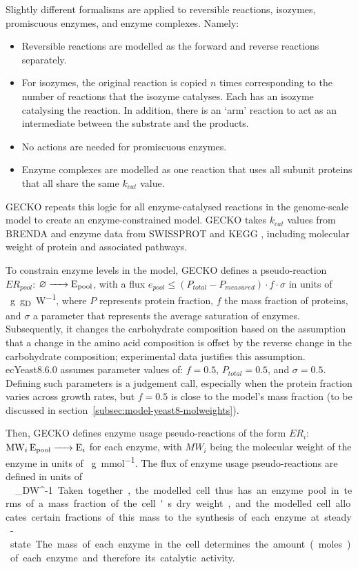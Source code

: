 Slightly different formalisms are applied to reversible reactions, isozymes, promiscuous enzymes, and enzyme complexes.  Namely:
\begin{itemize}
  \item Reversible reactions are modelled as the forward and reverse reactions separately.
  \item For isozymes, the original reaction is copied $n$ times corresponding to the number of reactions that the isozyme catalyses. Each has an isozyme catalysing the reaction.
  In addition, there is an `arm' reaction to act as an intermediate between the substrate and the products.
  \item No actions are needed for promiscuous enzymes.
  \item Enzyme complexes are modelled as one reaction that uses all subunit proteins that all share the same $k_{cat}$ value.
\end{itemize}

GECKO repeats this logic for all enzyme-catalysed reactions in the genome-scale model to create an enzyme-constrained model.
GECKO takes $k_{cat}$ values from BRENDA \parencite{changBRENDAELIXIRCore2021} and enzyme data from SWISSPROT \parencite{theuniprotconsortiumUniProtUniversalProtein2023} and KEGG \parencite{kanehisaKEGGTaxonomybasedAnalysis2023}, including molecular weight of protein and associated pathways.

To constrain enzyme levels in the model, GECKO defines a pseudo-reaction $ER_{pool}$: $\varnothing \ce{ -> E_{pool} }$, with a flux $e_{pool} \le (P_{total} - P_{measured}) \cdot f \cdot \sigma$ in units of \SI{}{\gram~\gram_DW^{-1}}, where $P$ represents protein fraction, $f$ the mass fraction of proteins, and $\sigma$ a parameter that represents the average saturation of enzymes.
Subsequently, it changes the carbohydrate composition based on the assumption that a change in the amino acid composition is offset by the reverse change in the carbohydrate composition;
experimental data justifies this assumption.
ecYeast8.6.0 assumes parameter values of: $f = 0.5$, $P_{total} = 0.5$, and $\sigma = 0.5$.
Defining such parameters is a judgement call, especially when the protein fraction varies across growth rates, but $f = 0.5$ is close to the model's mass fraction (to be discussed in section~\ref{subsec:model-yeast8-molweights}).

Then, GECKO defines enzyme usage pseudo-reactions of the form $ER_{i}$: $\ce{ MW_{i} E_{pool} -> E_{i} }$ for each enzyme, with $MW_{i}$ being the molecular weight of the enzyme in units of \SI{}{\gram~\milli\mole^{-1}}.
The flux of enzyme usage pseudo-reactions are defined in units of \SI{}{\milli\mole~\gram_{DW}^{-1}}.
Taken together, the modelled cell thus has an enzyme pool in terms of a mass fraction of the cell's dry weight, and the modelled cell allocates certain fractions of this mass to the synthesis of each enzyme at steady-state.  The mass of each enzyme in the cell determines the amount (moles) of each enzyme and therefore its catalytic activity.

